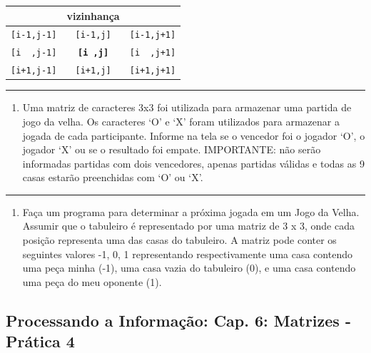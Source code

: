 \documentclass[12pt,a4paper]{article}
\providecommand{\tightlist}{%
      \setlength{\itemsep}{0pt}\setlength{\parskip}{0pt}}
\begin{document}
\begin{longtable}[]{@{}ccc@{}}
\toprule
& vizinhança &\tabularnewline
\midrule
\endhead
\texttt{{[}i-1,j-1{]}} & \texttt{{[}i-1,j{]}} &
\texttt{{[}i-1,j+1{]}}\tabularnewline
\texttt{{[}i\ \ ,j-1{]}} & \textbf{\texttt{{[}i\ ,j{]}}} &
\texttt{{[}i\ \ ,j+1{]}}\tabularnewline
\texttt{{[}i+1,j-1{]}} & \texttt{{[}i+1,j{]}} &
\texttt{{[}i+1,j+1{]}}\tabularnewline
\bottomrule
\end{longtable}

    \begin{center}\rule{0.5\linewidth}{0.5pt}\end{center}

\begin{enumerate}
\def\labelenumi{\arabic{enumi}.}
\setcounter{enumi}{6}
\tightlist
\item
  Uma matriz de caracteres 3x3 foi utilizada para armazenar uma partida
  de jogo da velha. Os caracteres `O' e `X' foram utilizados para
  armazenar a jogada de cada participante. Informe na tela se o vencedor
  foi o jogador `O', o jogador `X' ou se o resultado foi empate.
  IMPORTANTE: não serão informadas partidas com dois vencedores, apenas
  partidas válidas e todas as 9 casas estarão preenchidas com `O' ou
  `X'.
\end{enumerate}

    \begin{center}\rule{0.5\linewidth}{0.5pt}\end{center}

\begin{enumerate}
\def\labelenumi{\arabic{enumi}.}
\setcounter{enumi}{7}
\tightlist
\item
  Faça um programa para determinar a próxima jogada em um Jogo da Velha.
  Assumir que o tabuleiro é representado por uma matriz de 3 x 3, onde
  cada posição representa uma das casas do tabuleiro. A matriz pode
  conter os seguintes valores -1, 0, 1 representando respectivamente uma
  casa contendo uma peça minha (-1), uma casa vazia do tabuleiro (0), e
  uma casa contendo uma peça do meu oponente (1).
\end{enumerate}

    \hypertarget{processando-a-informauxe7uxe3o-cap.-6-matrizes---pruxe1tica-4}{%
\subsection{Processando a Informação: Cap. 6: Matrizes - Prática
4}\label{processando-a-informauxe7uxe3o-cap.-6-matrizes---pruxe1tica-4}}
\end{document}
